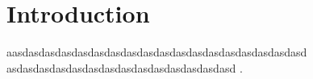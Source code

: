\documentclass{article}
\begin{document}
\section{Introduction}

aasdasdasdasdasdasdasdasdasdasdasdasdasdasdasdasdasdasd
asdasdasdasdasdasdasdasdasdasdasdasdasdasd \cite{fahrmeir2007regression}.

\begin{comment}
	
\begin{figure}[H]
	\centering
	\begin{tikzpicture}
		\begin{axis}[
			xlabel = "x1",
			ylabel = "x",
			axis lines = none,
			ticks = none,
			scatter/classes={%
				e={mark=o},
				f={mark=*, mark options={fill=black, scale=2}},
				x={mark=x}}]
			\addplot[scatter,only marks,%
			scatter src=explicit symbolic]%
			table[meta=label] {
				x     y   label
				0.    0   e 
				0.2   0   e 
				0.4   0   e 
				0.6   0   e 
				0.8   0   e 

				0.    0.2  e 
				0.2   0.2  e 
				0.4   0.2  f 
				0.6   0.2  e 
				0.8   0.2  e 

				0.    0.4  e 
				0.2   0.4  f 
				0.4   0.4  x 
				0.6   0.4  f 
				0.8   0.4  e 

				0.    0.6  e 
				0.2   0.6  e 
				0.4   0.6  f 
				0.6   0.6  e 
				0.8   0.6  e 

				0.    0.8  e 
				0.2   0.8  e 
				0.4   0.8  e  
				0.6   0.8  e 
				0.8   0.8  e 
		};
	
		\node[] at (axis cs: .055,.755) {$\beta_{1,1}$};
		\node[] at (axis cs: .45,.35) {$\beta_{j,r}$};
		\node[] at (axis cs: .475,.15) {$\beta_{j+1,r}$};
		\node[] at (axis cs: .475,.55) {$\beta_{j-1,r}$};
		\node[] at (axis cs: .275,.35) {$\beta_{j,r-1}$};
		\node[] at (axis cs: .675,.35) {$\beta_{j,r+1}$};	
		\node[] at (axis cs: .845, -0.05) {$\beta_{5,5}$};
\end{axis}
	\end{tikzpicture}
	\caption{Spatial neighborhood}
	\label{fig:sph}
\end{figure}
\end{comment}



\end{document}
